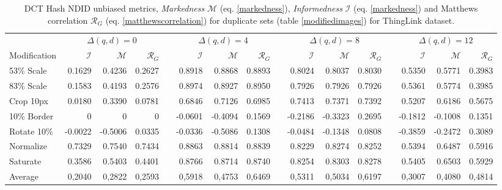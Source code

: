 \documentclass[english,12pt,a4paper,pdftex,elec,utf8, table]{aaltothesis}
\begin{document}
\begin{table}\footnotesize
\caption{ DCT Hash NDID unbiased metrics, \emph{Markedness} $\mathcal{M}$ (eq. \ref{markedness}), \emph{Informedness} $\mathcal{I}$ (eq. \ref{markedness}) and Matthews correlation $\mathcal{R}_G$ (eq. \ref{matthewscorrelation}) for duplicate sets (table \ref{modifiedimages}) for ThingLink dataset. }
\label{dctthinglinkunbiased}
\begin{center}
  \setlength\tabcolsep{3pt} %
  \begin{tabular}{@{}lrrrrrrrrrrrrrrr@{}}
    \toprule
    & \multicolumn{3}{c}{$\Delta(q,d) = 0$} &\phantom{abc} &\multicolumn{3}{c}{$\Delta(q,d) = 4$} &\phantom{abc} & \multicolumn{3}{c}{$\Delta(q,d)=8$} &\phantom{abc} & \multicolumn{3}{c}{$\Delta(q,d)=12$}\\
\cmidrule{2-4} \cmidrule{6-8} \cmidrule{10-12} \cmidrule{14-16}
    Modification & $\mathcal{I}$ & $\mathcal{M}$ & $\mathcal{R}_G$ &\phantom{abc} & $\mathcal{I}$ & $\mathcal{M}$ & $\mathcal{R}_G$ &\phantom{abc} & $\mathcal{I}$ & $\mathcal{M}$ & $\mathcal{R}_G$ &\phantom{abc} & $\mathcal{I}$ & $\mathcal{M}$ & $\mathcal{R}_G$\\ \midrule
    53\% Scale   & 0.1629 & 0.4236 & 0.2627&\phantom{abc} & 0.8918 & 0.8868 & 0.8893  &\phantom{abc} & 0.8024 & 0.8037 & 0.8030  &\phantom{abc} & 0.5350 & 0.5771 & 0.3983\\
    83\% Scale   & 0.1583 & 0.4193 & 0.2576 &\phantom{abc} & 0.8974 & 0.8927 & 0.8950  &\phantom{abc} & 0.7926 & 0.7926 & 0.7926 &\phantom{abc} & 0.5361 & 0.5774 & 0.3985\\
    Crop 10px    & 0.0180 & 0.3390 & 0.0781 &\phantom{abc} & 0.6846 & 0.7126 & 0.6985  &\phantom{abc} & 0.7413 & 0.7371 & 0.7392 &\phantom{abc} & 0.5207 & 0.6186& 0.5675 \\
    10\% Border  & 0 & 0 & 0 & \phantom{abc} & -0.0601  & -0.4094  & 0.1569 &\phantom{abc} & -0.2186 & -0.3323 & 0.2695 &\phantom{abc} & -0.1812 & -0.1008 & 0.1351\\
    Rotate 10\%  & -0.0022 & -0.5006 & 0.0335  &\phantom{abc} & -0.0336 & -0.5086 & 0.1308&\phantom{abc} & -0.0484 & -0.1348 & 0.0808 &\phantom{abc} & -0.3859 & -0.2472& 0.3089\\
    Normalize    & 0.7329 & 0.7540 & 0.7434 &\phantom{abc} & 0.8863 & 0.8814 & 0.8839 &\phantom{abc} & 0.8229 & 0.8274& 0.8252  &\phantom{abc} & 0.5394 & 0.6487 & 0.5916\\
    Saturate     & 0.3586 & 0.5403 & 0.4401 &\phantom{abc} & 0.8766 & 0.8714 & 0.8740 &\phantom{abc} & 0.8254 & 0.8303 & 0.8278  &\phantom{abc} & 0.5405 & 0.6503 & 0.5929\\
\bottomrule
    Average      & 0,2040 & 0,2822 & 0,2593 & \phantom{abc} & \cellcolor{blue!25}0,5918 & 0,4753 & 0,6469 & \phantom{abc} & 0,5311 & 0,5034 & 0,6197 &\phantom{abc} & 0,3007& 0,4080& 0,4814\\

  \end{tabular}
\end{center}
\end{table}
\end{document}
